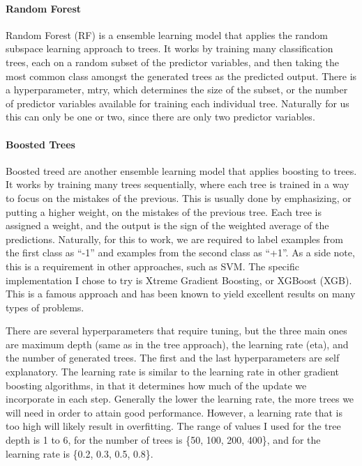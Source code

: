 \documentclass[
]{article}
\begin{document}
\hypertarget{random-forest}{%
\paragraph{Random Forest}\label{random-forest}}

Random Forest (RF) is a ensemble learning model that applies the random
subspace learning approach to trees. It works by training many
classification trees, each on a random subset of the predictor
variables, and then taking the most common class amongst the generated
trees as the predicted output. There is a hyperparameter, mtry, which
determines the size of the subset, or the number of predictor variables
available for training each individual tree. Naturally for us this can
only be one or two, since there are only two predictor variables.

\hypertarget{boosted-trees}{%
\paragraph{Boosted Trees}\label{boosted-trees}}

Boosted treed are another ensemble learning model that applies boosting
to trees. It works by training many trees sequentially, where each tree
is trained in a way to focus on the mistakes of the previous. This is
usually done by emphasizing, or putting a higher weight, on the mistakes
of the previous tree. Each tree is assigned a weight, and the output is
the sign of the weighted average of the predictions. Naturally, for this
to work, we are required to label examples from the first class as
``-1'' and examples from the second class as ``+1''. As a side note,
this is a requirement in other approaches, such as SVM. The specific
implementation I chose to try is Xtreme Gradient Boosting, or XGBoost
(XGB). This is a famous approach and has been known to yield excellent
results on many types of problems.

There are several hyperparameters that require tuning, but the three
main ones are maximum depth (same as in the tree approach), the learning
rate (eta), and the number of generated trees. The first and the last
hyperparameters are self explanatory. The learning rate is similar to
the learning rate in other gradient boosting algorithms, in that it
determines how much of the update we incorporate in each step. Generally
the lower the learning rate, the more trees we will need in order to
attain good performance. However, a learning rate that is too high will
likely result in overfitting. The range of values I used for the tree
depth is 1 to 6, for the number of trees is \{50, 100, 200, 400\}, and
for the learning rate is \{0.2, 0.3, 0.5, 0.8\}.
\end{document}

